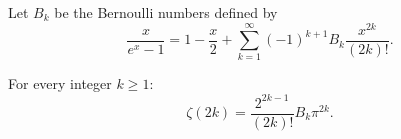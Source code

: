 Let $B_k$ be the Bernoulli numbers defined by
$$\frac{x}{e^x - 1} = 1 - \frac{x}{2} + \sum_{k=1}^{\infty} (-1)^{k+1} B_k \frac{x^{2k}}{(2k)!}.$$

For every integer $k \geq 1$:
$$\zeta(2k) = \frac{2^{2k-1}}{(2k)!} B_k \pi^{2k}.$$
